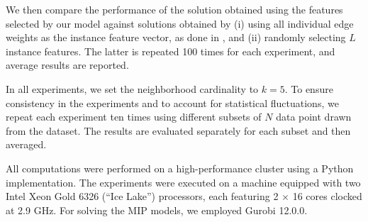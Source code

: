 \documentclass[11pt, a4paper]{article}
\newcommand{\FRil}[1]{\todo[color=black, textcolor=white, inline, author=FR]{#1}}
\newcommand{\I}{{\mathcal{I}}} %
\newcommand{\instance}{I}
\newcommand{\instanceindex}{i}
\newcommand{\instfeaturemap}[1][(\instance^\instanceindex)]{\phi_\I#1} %
\newcommand{\fsel}{S} %
\newcommand{\selectionset}{\fsel}
\newcommand{\neighbour}{\ensuremath{\mathcal{N}}}
\newcommand{\sEpsNeighbour}[1][(\instanceindex,\selectionset)]{\ensuremath{\neighbour^\le_\epsilon#1}}
\begin{document}
We then compare the performance of the solution obtained using the features selected by our model against solutions obtained by (i) using all individual edge weights as the instance feature vector, as done in \cite{aigner2024framework}, and (ii) randomly selecting $L$ instance features. The latter is repeated 100 times for each experiment, and average results are reported.






In all experiments, we set the neighborhood cardinality to  $k=5$. To ensure consistency in the experiments and to account for statistical fluctuations, we repeat each experiment ten times using different subsets of $N$ data point drawn from the dataset. The results are evaluated separately for each subset and then averaged.

All computations were performed on a high-performance cluster using a Python implementation.
The experiments were executed on a machine equipped with two Intel Xeon Gold 6326 (``Ice Lake'') processors, each featuring 2 $\times$ 16 cores clocked at 2.9 GHz. For solving the MIP models, we employed Gurobi 12.0.0.
\end{document}
